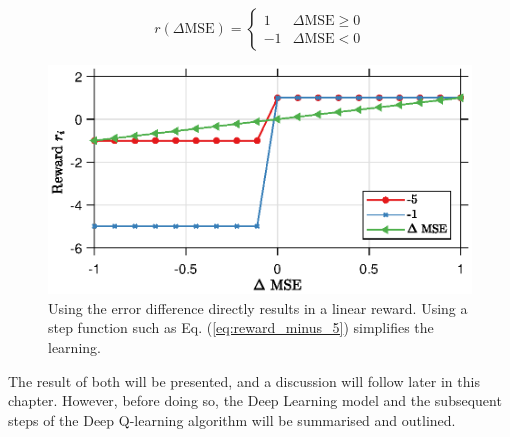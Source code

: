 \begin{equation}\label{eq:reward_minus_1}
r(\Delta \text{MSE}) = \begin{cases}
1 &\Delta \text{MSE} \geq 0\\
-1 &\Delta \text{MSE} < 0
\end{cases}
\end{equation}

\begin{figure}
    \centering
    \includegraphics{chapters/part_uplink/figures/reward_example_figure.eps}
    \caption{Using the error difference directly results in a linear reward. Using a step function such as Eq. (\ref{eq:reward_minus_5}) simplifies the learning.}
    \label{fig:reward_example_figure}
\end{figure}

The result of both will be presented, and a discussion will follow later in this chapter. However, before doing so, the Deep Learning model and the subsequent steps of the Deep Q-learning algorithm will be summarised and outlined.

